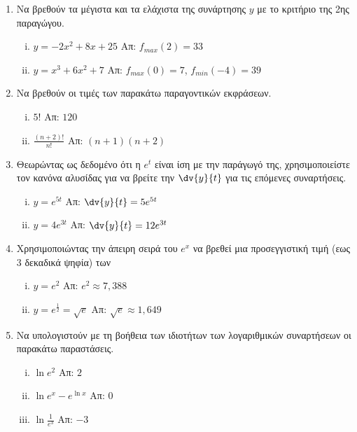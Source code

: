 \begin{enumerate}
    \item Να βρεθούν τα μέγιστα και τα ελάχιστα της συνάρτησης $ y $ με το κριτήριο της 2ης
        παραγώγου.

        \begin{enumerate}[i)]
            \item $ y = -2x^{2}+8x+25 $ \hfill Απ: $ f_{max}(2)=33 $
            \item $ y = x^{3}+6x^{2}+7 $ \hfill Απ: $ f_{max}(0)=7 $, $ f_{min}(-4)=39 $ 
        \end{enumerate}

    \item Να βρεθούν οι τιμές των παρακάτω παραγοντικών εκφράσεων.

        \begin{enumerate}[i)]
            \item $ 5! $ \hfill Απ: $ 120 $
            \item $ \frac{(n+2)!}{n!} $ \hfill Απ: $ (n+1)(n+2) $
        \end{enumerate}

    \item Θεωρώντας ως δεδομένο ότι η $ e^{t} $ είναι ίση με την παράγωγό της, χρησιμοποιείστε τον
        κανόνα αλυσίδας για να βρείτε την $ \dv{y}{t} $ για τις επόμενες συναρτήσεις.

        \begin{enumerate}[i)]
            \item $ y = e^{5t} $ \hfill Απ: $ \dv{y}{t} = 5e^{5t} $
            \item $ y = 4e^{3t} $ \hfill Απ: $ \dv{y}{t} = 12e^{3t} $ 
        \end{enumerate}

    \item Χρησιμοποιώντας την άπειρη σειρά του $ e^{x} $ να βρεθεί μια προσεγγιστική τιμή (εως 3
        δεκαδικά ψηφία) των 

        \begin{enumerate}[i)]
            \item $ y=e^{2} $ \hfill Απ: $ e^{2} \approx 7,388 $ 
            \item $ y=e^{\frac{1}{2}}= \sqrt{e} $ \hfill Απ: $ \sqrt{e} \approx 1,649 $ 
        \end{enumerate}

    \item Να υπολογιστούν με τη βοήθεια των ιδιοτήτων των λογαριθμικών συναρτήσεων οι παρακάτω
        παραστάσεις.

        \begin{enumerate}[i)]
            \item $ \ln{e^{2}} $ \hfill Απ: $ 2 $ 
            \item $ \ln{e^{x}} - e^{\ln{x}} $ \hfill Απ: $ 0  $ 
            \item $ \ln{\frac{1}{e^{3}}} $ \hfill Απ: $ -3 $ 
        \end{enumerate}


\end{enumerate}
